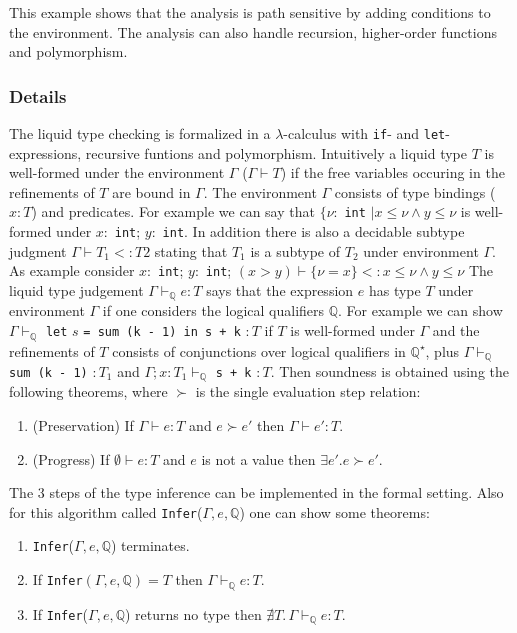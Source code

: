 \documentclass[a4paper,UKenglish]{lipics-v2016}
\begin{document}
This example shows that the analysis is path sensitive by adding conditions to the environment.
The analysis can also handle recursion, higher-order functions and polymorphism.

\subsubsection{Details}

The liquid type checking is formalized in a $\lambda$-calculus with \lstinline{if}- and \lstinline{let}-expressions, recursive funtions and polymorphism.
Intuitively a liquid type $T$ is well-formed under the environment $\Gamma$ ($\Gamma \vdash T$) if the free variables occuring in the refinements of $T$ are bound in $\Gamma$.
The environment $\Gamma$ consists of type bindings ($x: T$) and predicates.
For example we can say that $\{\nu:$ \lstinline{int} $\mid x \le \nu \land y \le \nu$ is well-formed under $x:$ \lstinline{int}; $y:$ \lstinline{int}.
In addition there is also a decidable subtype judgment $\Gamma \vdash T_1 <: T2$ stating that $T_1$ is a subtype of $T_2$ under environment $\Gamma$.
As example consider $x:$ \lstinline{int}; $y:$ \lstinline{int}; $(x > y) \vdash \{\nu = x \} <: x \le \nu \land y \le \nu$
The liquid type judgement $\Gamma \vdash_{\mathbb{Q}} e: T$ says that the expression $e$ has type $T$ under environment $\Gamma$ if one considers the logical qualifiers $\mathbb{Q}$.
For example we can show $\Gamma \vdash_{\mathbb{Q}}$ \lstinline{let} $s$ \lstinline{= sum (k - 1) in s + k} $: T$ if $T$ is well-formed under $\Gamma$ and the refinements of $T$ consists of conjunctions over logical qualifiers in $\mathbb{Q}^\star$, plus
$\Gamma \vdash_{\mathbb{Q}}$ \lstinline{sum (k - 1)} $:T_1$ and $\Gamma; x: T_1 \vdash_{\mathbb{Q}}$ \lstinline{s + k} $: T$.
Then soundness is obtained using the following theorems, where $\succ$ is the single evaluation step relation:
\begin{enumerate}
    \label{thm:sound}
    \item (Preservation) If $\Gamma \vdash e: T$ and $e \succ e'$ then $\Gamma \vdash e': T$.
    \item (Progress) If $\emptyset \vdash e: T$ and $e$ is not a value then $\exists e'. e \succ e'$.
\end{enumerate}

The 3 steps of the type inference can be implemented in the formal setting.
Also for this algorithm called \lstinline{Infer}($\Gamma, e, \mathbb{Q}$) one can show some theorems:
\begin{enumerate}
    \item \lstinline{Infer}($\Gamma, e, \mathbb{Q}$) terminates.
    \item If \lstinline{Infer}$(\Gamma, e, \mathbb{Q}) = T$ then $\Gamma \vdash_{\mathbb{Q}} e: T$.
    \item If \lstinline{Infer}($\Gamma, e, \mathbb{Q}$) returns no type then $\nexists T.\, \Gamma \vdash_{\mathbb{Q}} e: T$.
\end{enumerate}
\end{document}
